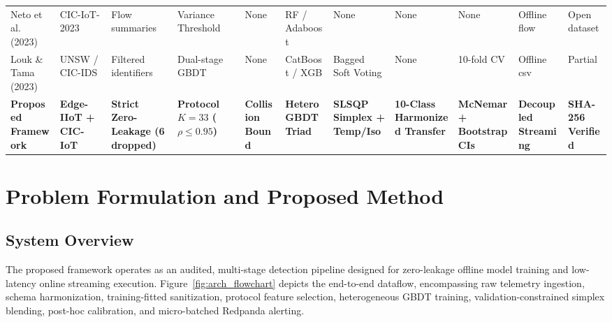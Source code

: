 \documentclass[10pt,journal,twocolumn]{IEEEtran}
\begin{document}
\begin{table}[t]
{\begin{tabular}{lllllllllll}
Neto et al.\ \cite{ref2} (2023) & CIC-IoT-2023 & Flow summaries & Variance Threshold & None & RF / Adaboost & None & None & None & Offline flow & Open dataset \\
Louk \& Tama \cite{ref9} (2023) & UNSW / CIC-IDS & Filtered identifiers & Dual-stage GBDT & None & CatBoost / XGB & Bagged Soft Voting & None & 10-fold CV & Offline csv & Partial \\
\midrule
\textbf{Proposed Framework} & \textbf{Edge-IIoT + CIC-IoT} & \textbf{Strict Zero-Leakage (6 dropped)} & \textbf{Protocol $K=33$ ($\rho \le 0.95$)} & \textbf{Collision Bound} & \textbf{Hetero GBDT Triad} & \textbf{SLSQP Simplex + Temp/Iso} & \textbf{10-Class Harmonized Transfer} & \textbf{McNemar + Bootstrap CIs} & \textbf{Decoupled Streaming} & \textbf{SHA-256 Verified} \\
\bottomrule
\end{tabular}}
\end{table}

\section{Problem Formulation and Proposed Method}

\subsection{System Overview}
The proposed framework operates as an audited, multi-stage detection pipeline designed for zero-leakage offline model training and low-latency online streaming execution. Figure~\ref{fig:arch_flowchart} depicts the end-to-end dataflow, encompassing raw telemetry ingestion, schema harmonization, training-fitted sanitization, protocol feature selection, heterogeneous GBDT training, validation-constrained simplex blending, post-hoc calibration, and micro-batched Redpanda alerting.
\end{document}
